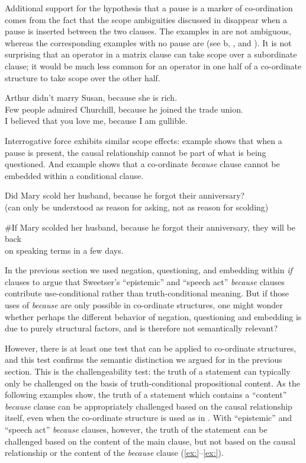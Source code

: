 Additional support for the hypothesis that a pause is a marker of co-ordination comes from the fact that the scope ambiguities discussed in  disappear when a pause is inserted between the two clauses. The examples in  are not ambiguous, whereas the corresponding examples with no pause are (see b, , and ). It is not surprising that an operator in a matrix clause can take scope over a subordinate clause; it would be much less common for an operator in one half of a co-ordinate structure to take scope over the other half.


\ea
\ea Arthur didn’t marry Susan, because she is rich.\\
\ex Few people admired Churchill, because he joined the trade union.\\
\ex I believed that you love me, because I am gullible.
                       \z
\z


Interrogative force exhibits similar scope effects: example  shows that when a pause is present, the causal relationship cannot be part of what is being questioned. And example  shows that a co-ordinate \textit{because} clause cannot be embedded within a conditional clause.


\ea
Did Mary scold her husband, because he forgot their anniversary?\\
  (can only be understood as reason for asking, not as reason for scolding)
\z

\ea
\#If Mary scolded her husband, because he forgot their anniversary, they will be back\\
  on speaking terms in a few days.
\z


In the previous section we used negation, questioning, and embedding within \textit{if} clauses to argue that Sweetser’s “epistemic” and “speech act” \textit{because} clauses contribute use-conditional rather than truth-conditional meaning. But if those uses of \textit{because} are only possible in co-ordinate structures, one might wonder whether perhaps the different behavior of negation, questioning and embedding is due to purely structural factors, and is therefore not semantically relevant?



However, there is at least one test that can be applied to co-ordinate structures, and this test confirms the semantic distinction we argued for in the previous section. This is the challengeability test: the truth of a statement can typically only be challenged on the basis of truth-conditional propositional content. As the following examples show, the truth of a statement which contains a “content” \textit{because} clause can be appropriately challenged based on the causal relationship itself, even when the co-ordinate structure is used as in . With “epistemic” and “speech act” \textit{because} clauses, however, the truth of the statement can be challenged based on the content of the main clause, but not based on the causal relationship or the content of the \textit{because} clause (\ref{ex:}--\ref{ex:}).


